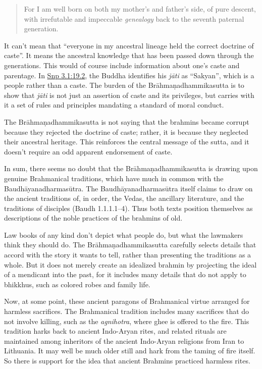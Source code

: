 \documentclass[12pt,openany]{book}%
\begin{document}
\begin{quotation}%
For I am well born on both my mother’s and father’s side, of pure descent, with irrefutable and impeccable \emph{genealogy} back to the seventh paternal generation.

%
\end{quotation}

It can’t mean that “everyone in my ancestral lineage held the correct doctrine of caste”. It means the ancestral knowledge that has been passed down through the generations. This would of course include information about one’s caste and parentage. In \href{https://suttacentral.net/snp3.1/en/sujato\#19.2}{Snp 3.1:19.2}, the Buddha identifies his \textit{\textsanskrit{jāti}} as “Sakyan”, which is a people rather than a caste. The burden of the \textsanskrit{Brāhmaṇadhammikasutta} is to show that \textit{\textsanskrit{jāti}} is not just an assertion of caste and its privileges, but carries with it a set of rules and principles mandating a standard of moral conduct.

The \textsanskrit{Brāhmaṇadhammikasutta} is not saying that the brahmins became corrupt because they rejected the doctrine of caste; rather, it is because they neglected their ancestral heritage. This reinforces the central message of the sutta, and it doesn’t require an odd apparent endorsement of caste.

In sum, there seems no doubt that the \textsanskrit{Brāhmaṇadhammikasutta} is drawing upon genuine Brahmanical traditions, which have much in common with the \textsanskrit{Baudhāyanadharmasūtra}. The \textsanskrit{Baudhāyanadharmasūtra} itself claims to draw on the ancient traditions of, in order, the Vedas, the ancillary literature, and the traditions of disciples (Baudh 1.1.1.1–4). Thus both texts position themselves as descriptions of the noble practices of the brahmins of old.

Law books of any kind don’t depict what people do, but what the lawmakers think they should do. The \textsanskrit{Brāhmaṇadhammikasutta} carefully selects details that accord with the story it wants to tell, rather than presenting the traditions as a whole. But it does not merely create an idealized brahmin by projecting the ideal of a mendicant into the past, for it includes many details that do not apply to bhikkhus, such as colored robes and family life.

Now, at some point, these ancient paragons of Brahmanical virtue arranged for harmless sacrifices. The Brahmanical tradition includes many sacrifices that do not involve killing, such as the \textit{agnihotra}, where ghee is offered to the fire. This tradition harks back to ancient Indo-Aryan rites, and related rituals are maintained among inheritors of the ancient Indo-Aryan religions from Iran to Lithuania. It may well be much older still and hark from the taming of fire itself. So there is support for the idea that ancient Brahmins practiced harmless rites.
\end{document}
